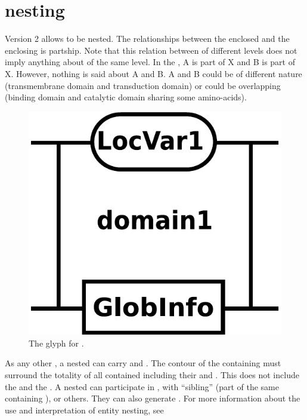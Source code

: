 
\section{ nesting }
\label{sec:domain}

\SBGNERLone Version 2 allows  to be nested. The relationships between the enclosed  and the enclosing  is partship. Note that this relation between  of different levels does not imply anything about  of the same level. In the , A is part of X and B is part of X. However, nothing is said about A and B. A and B could be of different nature (transmembrane domain and transduction domain) or could be overlapping (binding domain and catalytic domain sharing some amino-acids). 

\begin{figure}[H]
  \centering
  \includegraphics[scale = 0.3]{images/domain}
  \caption{The \ER glyph for .}
  \label{fig:domain}
\end{figure}

As any other , a nested  can carry  and . The contour of the containing  must surround the totality of all contained  including their  and . This does not include the  and the . A nested  can participate in , with ``sibling''  (part of the same containing ), or others. They can also generate . For more information about the use and interpretation of entity nesting, see  

